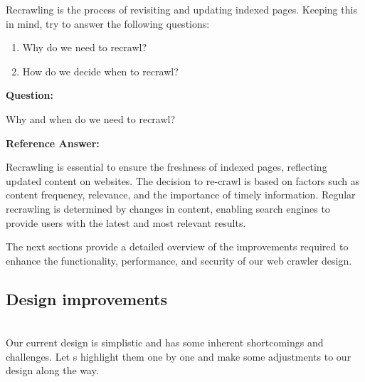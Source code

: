 Recrawling is the process of revisiting and updating indexed pages. Keeping this in mind, try to answer the following questions:

\begin{enumerate}
\item
Why do we need to recrawl?
\item
How do we decide when to recrawl?
\end{enumerate}

\textbf{Question:}

Why and when do we need to recrawl?

\textbf{Reference Answer:}

Recrawling is essential to ensure the freshness of indexed pages, reflecting updated content on websites. The decision to re-crawl is based on factors such as content frequency, relevance, and the importance of timely information. Regular recrawling is determined by changes in content, enabling search engines to provide users with the latest and most relevant results.

The next sections provide a detailed overview of the improvements required to enhance the functionality, performance, and security of our web crawler design.

\subsection{Design improvements}\label{kedmMqGrBHlFuvQeg9EoQ}
\\
Our current design is simplistic and has some inherent shortcomings and challenges. Let
\textquotesingle s highlight them one by one and make some adjustments to our design along the way.

